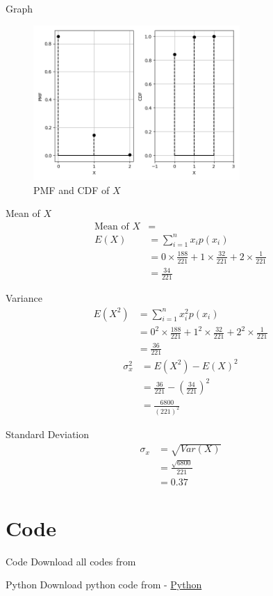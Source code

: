 \documentclass{beamer}
\providecommand{\brak}[1]{\ensuremath{\left(#1\right)}}
\begin{document}
\begin{frame}{Graph}
\begin{figure}
    \centering
    \includegraphics[width = 0.7\textwidth]{figures/plot}
    \caption{PMF and CDF of $X$}
    \label{fig:figure1}
\end{figure}
\end{frame}
\begin{frame}{Mean of $X$}
\begin{align}
\text{Mean of $X$} &=\\
E(X) &= \sum_{i=1}^nx_ip(x_i)\\
&= 0\times\frac{188}{221}+1\times\frac{32}{221}+2\times\frac{1}{221}\\
&= \frac{34}{221}
\end{align}
\end{frame}
\begin{frame}{Variance}
    \begin{align}
    E(X^2) &= \sum_{i=1}^{n}x_i^2p(x_i)\\
    &= 0^2\times\frac{188}{221}+1^2\times\frac{32}{221}+2^2\times\frac{1}{221}\\
    &= \frac{36}{221}
\end{align}
\begin{align}
    \sigma_x^2 &= E(X^2) - E(X)^2\\
    &= \frac{36}{221} - \brak{\frac{34}{221}}^2 \\
    &= \frac{6800}{(221)^2}
\end{align}
\end{frame}
\begin{frame}{Standard Deviation}
    \begin{align}
    \sigma_x &= \sqrt{Var(X)} \\
    &= \frac{\sqrt{6800}}{221}\\
    &= 0.37
\end{align}
\end{frame}
\section{Code}
\begin{frame}{Code}
Download all codes from
\begin{block}{Python}
         Download python code from - \href{https://github.com/NityaBhamidipaty/AI1110_Assig/tree/main/Assig6/codes}{Python}
    \end{block}
\end{frame}
\end{document}
